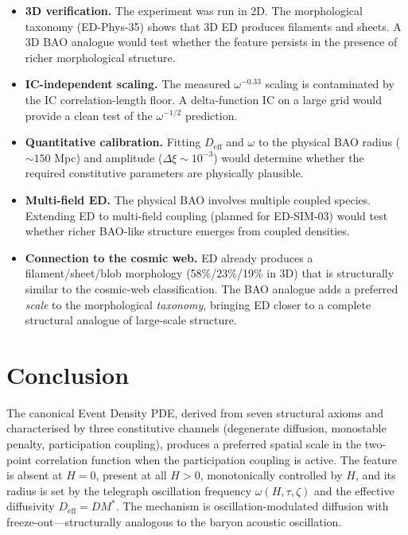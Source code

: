 \documentclass[11pt]{article}
\begin{document}
\begin{itemize}
  \item \textbf{3D verification.} The experiment was run in 2D. The morphological taxonomy (ED-Phys-35) shows that 3D ED produces filaments and sheets. A 3D BAO analogue would test whether the feature persists in the presence of richer morphological structure.

  \item \textbf{IC-independent scaling.} The measured \(\omega^{-0.33}\) scaling is contaminated by the IC correlation-length floor. A delta-function IC on a large grid would provide a clean test of the \(\omega^{-1/2}\) prediction.

  \item \textbf{Quantitative calibration.} Fitting \(D_{\mathrm{eff}}\) and \(\omega\) to the physical BAO radius (\(\sim 150\) Mpc) and amplitude (\(\Delta\xi \sim 10^{-3}\)) would determine whether the required constitutive parameters are physically plausible.

  \item \textbf{Multi-field ED.} The physical BAO involves multiple coupled species. Extending ED to multi-field coupling (planned for ED-SIM-03) would test whether richer BAO-like structure emerges from coupled densities.

  \item \textbf{Connection to the cosmic web.} ED already produces a filament/sheet/blob morphology (58\%/23\%/19\% in 3D) that is structurally similar to the cosmic-web classification. The BAO analogue adds a preferred \emph{scale} to the morphological \emph{taxonomy}, bringing ED closer to a complete structural analogue of large-scale structure.
\end{itemize}

\section{Conclusion}

The canonical Event Density PDE, derived from seven structural axioms and characterised by three constitutive channels (degenerate diffusion, monostable penalty, participation coupling), produces a preferred spatial scale in the two-point correlation function when the participation coupling is active. The feature is absent at \(H = 0\), present at all \(H > 0\), monotonically controlled by \(H\), and its radius is set by the telegraph oscillation frequency \(\omega(H, \tau, \zeta)\) and the effective diffusivity \(D_{\mathrm{eff}} = D M^*\). The mechanism is oscillation-modulated diffusion with freeze-out---structurally analogous to the baryon acoustic oscillation.
\end{document}

